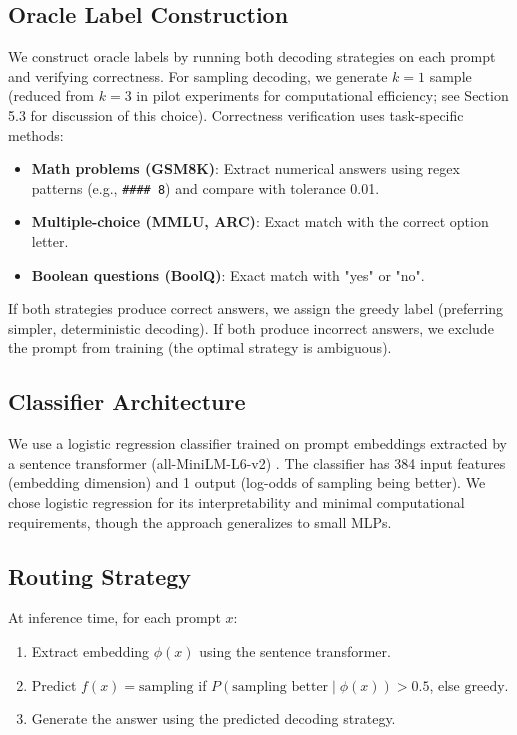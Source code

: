 \documentclass[11pt,letterpaper]{article}
\begin{document}
\subsection{Oracle Label Construction}

We construct oracle labels by running both decoding strategies on each prompt and verifying correctness. For sampling decoding, we generate $k=1$ sample (reduced from $k=3$ in pilot experiments for computational efficiency; see Section 5.3 for discussion of this choice). Correctness verification uses task-specific methods:

\begin{itemize}
    \item \textbf{Math problems (GSM8K)}: Extract numerical answers using regex patterns (e.g., \texttt{\#\#\#\# 8}) and compare with tolerance 0.01.
    \item \textbf{Multiple-choice (MMLU, ARC)}: Exact match with the correct option letter.
    \item \textbf{Boolean questions (BoolQ)}: Exact match with "yes" or "no".
\end{itemize}

If both strategies produce correct answers, we assign the greedy label (preferring simpler, deterministic decoding). If both produce incorrect answers, we exclude the prompt from training (the optimal strategy is ambiguous).

\subsection{Classifier Architecture}

We use a logistic regression classifier trained on prompt embeddings extracted by a sentence transformer (all-MiniLM-L6-v2) \cite{Reimers2019}. The classifier has 384 input features (embedding dimension) and 1 output (log-odds of sampling being better). We chose logistic regression for its interpretability and minimal computational requirements, though the approach generalizes to small MLPs.

\subsection{Routing Strategy}

At inference time, for each prompt $x$:
\begin{enumerate}
    \item Extract embedding $\phi(x)$ using the sentence transformer.
    \item Predict $f(x) = \text{sampling}$ if $P(\text{sampling better} \mid \phi(x)) > 0.5$, else $\text{greedy}$.
    \item Generate the answer using the predicted decoding strategy.
\end{enumerate}
\end{document}
